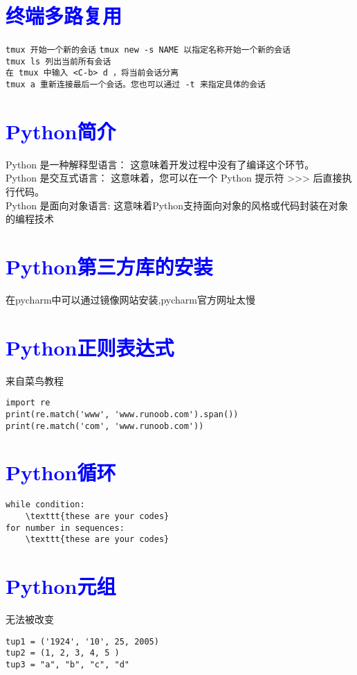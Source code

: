 \documentclass{article}
\begin{document}
\section{\textcolor{blue}{终端多路复用}}
\verb+tmux 开始一个新的会话+
\verb+tmux new -s NAME 以指定名称开始一个新的会话+\\
\verb+tmux ls 列出当前所有会话+\\
\verb+在 tmux 中输入 <C-b> d ，将当前会话分离+\\
\verb+tmux a 重新连接最后一个会话。您也可以通过 -t 来指定具体的会话+\\
\section{\textcolor{blue}{Python简介}}
Python 是一种解释型语言： 这意味着开发过程中没有了编译这个环节。\\
Python 是交互式语言： 这意味着，您可以在一个 Python 提示符 >>> 后直接执行代码。\\
Python 是面向对象语言: 这意味着Python支持面向对象的风格或代码封装在对象的编程技术
\section{\textcolor{blue}{Python第三方库的安装}}
在pycharm中可以通过镜像网站安装,pycharm官方网址太慢
\section{\textcolor{blue}{Python正则表达式}}
来自菜鸟教程
\begin{lstlisting}
import re
print(re.match('www', 'www.runoob.com').span())
print(re.match('com', 'www.runoob.com'))
\end{lstlisting}
\section{\textcolor{blue}{Python循环}}
\begin{lstlisting}
while condition:
    \texttt{these are your codes}
for number in sequences:
    \texttt{these are your codes}
\end{lstlisting}
\section{\textcolor{blue}{Python元组}}
无法被改变
\begin{lstlisting}
tup1 = ('1924', '10', 25, 2005)
tup2 = (1, 2, 3, 4, 5 )
tup3 = "a", "b", "c", "d"
\end{lstlisting}
\end{document}
